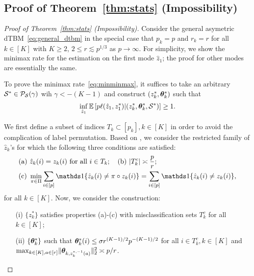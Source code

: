 \documentclass[journal]{IEEEtran}
\theoremstyle{definition}
\theoremstyle{definition}
\begin{document}
\subsection{Proof of Theorem~\ref{thm:stats} (Impossibility)}\label{sec:statprove1}

\begin{proof}[Proof of Theorem~\ref{thm:stats} (Impossibility)]Consider the general asymetric dTBM~\eqref{eq:general_dtbm} in the special case that $p_k = p$ and $r_k = r$ for all $ k\in [K]$ {with $K\geq 2$, $2 \leq r\lesssim p^{1/3}$ as $p \rightarrow \infty$}. For simplicity, we show the minimax rate for the estimation on the first mode $\hat z_1$; the proof for other modes are essentially the same. 
   
   To prove the minimax rate~\eqref{eq:minminmax}, it suffices to take an arbitrary $\mathcal{S}^* \in  \mathcal{P}_{\mathcal{S}}(\gamma)$ wih $\gamma < -(K-1)$ and construct $(z^*_k, \boldsymbol{\theta}^*_k)$ such that 
   \begin{equation}
       \inf_{\hat z_1} \mathbb{E} \left[ p\ell(\hat z_1, z_1^*) | (z^*_k, \boldsymbol{\theta}^*_k, \mathcal{S}^*)  \right]\geq 1.
   \end{equation}
   
   We first define a subset of indices $T_k \subset [p_k], k \in [K]$ in order to avoid the complication of label permutation. Based on \cite[Proof of Theorem 6]{han2020exact}, we consider the restricted family of $\hat z_k$'s for which the following three conditions are satisfied:
   \begin{align}
        &\text{(a)}\ \hat z_k(i)=z_k(i) \text{ for all }i\in T_k; \quad \text{(b)} \ |T^c_k|\asymp {p\over r}; \\
        &\text{(c)}\ \min_{\pi\in \Pi}\sum_{i\in[p]}\ind\{\hat z_k(i) \neq \pi\circ z_k (i)\} = \sum_{i\in[p]}\ind\{\hat z_k(i) \neq  z_k (i)\},
   \end{align}
for all $k \in [K]$.
   Now, we consider the construction:
   \begin{enumerate}
       \item[(i)] $\{z_k^*\}$ satisfies properties (a)-(c) with misclassification sets $T_k^c$ for all $k \in [K]$;
       \item [(ii)] $\{\boldsymbol{\theta}_k^*\}$ such that $\boldsymbol{\theta}_k^*(i) \leq \sigma r^{(K-1)/2} p^{-(K-1)/2}$ for all $i \in T_k^c, k \in [K]$ and $\max_{k \in [K], a \in [r]} \lVert\boldsymbol{\theta}_{k, z^{*, -1}_k(a)}\rVert^2_2 \asymp p/r$.
   \end{enumerate}
   

\end{proof}
\end{document}
